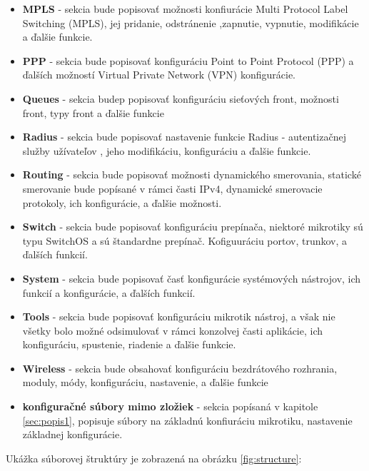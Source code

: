 \begin{itemize}
\item \textbf{MPLS} - sekcia bude popisovať možnosti konfiurácie Multi Protocol Label Switching (MPLS), jej pridanie, odstránenie ,zapnutie, vypnutie, modifikácie a ďalšie funkcie.
\item \textbf{PPP} - sekcia bude popisovať konfiguráciu Point to Point Protocol (PPP) a ďalších možností Virtual Private Network (VPN) konfigurácie.
\item \textbf{Queues} - sekcia budep popisovať konfiguráciu sieťových front, možnosti front, typy front a ďalšie funkcie
\item \textbf{Radius} - sekcia bude popisovať nastavenie funkcie Radius - autentizačnej služby užívateľov , jeho modifikáciu, konfiguráciu a ďalšie funkcie.
\item \textbf{Routing} - sekcia bude popisovať možnosti dynamického smerovania, statické smerovanie bude popísané v rámci časti IPv4, dynamické smerovacie protokoly, ich konfigurácie, a ďalšie možnosti. 
\item \textbf{Switch} - sekcia bude popisovať konfiguráciu prepínača, niektoré mikrotiky sú typu SwitchOS a sú štandardne prepínač. Kofiguuráciu portov, trunkov, a ďalších funkcií. 
\item \textbf{System} - sekcia bude popisovať časť konfigurácie systémových nástrojov, ich funkcií a konfigurácie, a ďalších funkcií.
\item \textbf{Tools} - sekcia bude popisovať konfiguráciu mikrotik nástroj, a však nie všetky bolo možné odsimulovať v rámci konzolvej časti aplikácie, ich konfiguráciu, spustenie, riadenie a ďalšie funkcie. 
\item \textbf{Wireless} - sekcia bude obsahovať konfiguráciu bezdrátového rozhrania, moduly, módy, konfiguráciu, nastavenie, a ďalšie funkcie
\item \textbf{konfiguračné súbory mimo zložiek} - sekcia popísaná v kapitole  \ref{sec:popis1}, popisuje súbory na základnú konfiuráciu mikrotiku, nastavenie základnej konfigurácie.
\end{itemize}
Ukážka súborovej štruktúry je zobrazená na obrázku \ref{fig:structure}:
